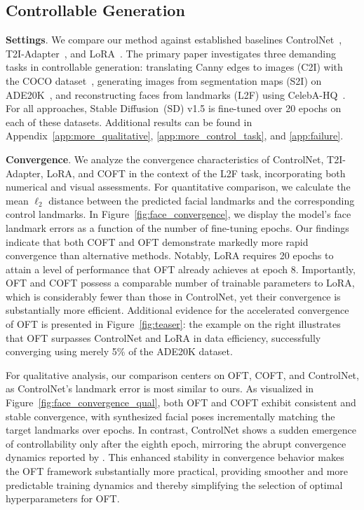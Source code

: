 \subsection{Controllable Generation}

\textbf{Settings}. We compare our method against established baselines ControlNet~\cite{zhang2023adding}, T2I-Adapter~\cite{mou2023t2i}, and LoRA~\cite{hulora2022}. The primary paper investigates three demanding tasks in controllable generation: translating Canny edges to images (C2I) with the COCO dataset~\cite{lin2014microsoft}, generating images from segmentation maps (S2I) on ADE20K~\cite{zhou2017scene}, and reconstructing faces from landmarks (L2F) using CelebA-HQ~\cite{karras2018progressive,xia2021tedigan}. For all approaches, Stable Diffusion~(SD) v1.5 is fine-tuned over 20 epochs on each of these datasets. Additional results can be found in Appendix~\ref{app:more_qualitative}, \ref{app:more_control_task}, and \ref{app:failure}.

\textbf{Convergence}. We analyze the convergence characteristics of ControlNet, T2I-Adapter, LoRA, and COFT in the context of the L2F task, incorporating both numerical and visual assessments. For quantitative comparison, we calculate the mean $\ell_2$ distance between the predicted facial landmarks and the corresponding control landmarks. In Figure~\ref{fig:face_convergence}, we display the model’s face landmark errors as a function of the number of fine-tuning epochs. Our findings indicate that both COFT and OFT demonstrate markedly more rapid convergence than alternative methods. Notably, LoRA requires 20 epochs to attain a level of performance that OFT already achieves at epoch 8. Importantly, OFT and COFT possess a comparable number of trainable parameters to LoRA, which is considerably fewer than those in ControlNet, yet their convergence is substantially more efficient. Additional evidence for the accelerated convergence of OFT is presented in Figure~\ref{fig:teaser}: the example on the right illustrates that OFT surpasses ControlNet and LoRA in data efficiency, successfully converging using merely 5\% of the ADE20K dataset. 

For qualitative analysis, our comparison centers on OFT, COFT, and ControlNet, as ControlNet’s landmark error is most similar to ours. As visualized in Figure~\ref{fig:face_convergence_qual}, both OFT and COFT exhibit consistent and stable convergence, with synthesized facial poses incrementally matching the target landmarks over epochs. In contrast, ControlNet shows a sudden emergence of controllability only after the eighth epoch, mirroring the abrupt convergence dynamics reported by \cite{zhang2023adding}. This enhanced stability in convergence behavior makes the OFT framework substantially more practical, providing smoother and more predictable training dynamics and thereby simplifying the selection of optimal hyperparameters for OFT.

